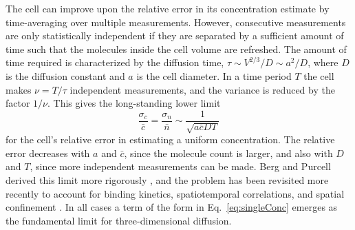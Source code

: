 The cell can improve upon the relative error in its concentration estimate by time-averaging over multiple measurements. However, consecutive measurements are only statistically independent if they are separated by a sufficient amount of time such that the molecules inside the cell volume are refreshed. The amount of time required is characterized by the diffusion time, $\tau \sim V^{2/3}/D \sim a^2/D$, where $D$ is the diffusion constant and $a$ is the cell diameter. In a time period $T$ the cell makes $\nu = T/\tau$ independent measurements, and the variance is reduced by the factor $1/\nu$. This gives the long-standing lower limit
\begin{equation} \label{eq:singleConc}
\frac{ \sigma_c }{\bar{c}} = \frac{ \sigma_n}{\bar{n}} \sim \frac{1}{\sqrt{a\bar{c}DT}}
\end{equation}
for the cell's relative error in estimating a uniform concentration.
The relative error decreases with $a$ and $\bar{c}$, since the molecule count is larger, and also with $D$ and $T$, since more independent measurements can be made. Berg and Purcell derived this limit more rigorously \cite{berg1977physics}, and the problem has been revisited more recently to account for binding kinetics, spatiotemporal correlations, and spatial confinement \cite{bialek2005physical, kaizu2014berg, bicknell2015limits}. In all cases a term of the form in Eq.\ \ref{eq:singleConc} emerges as the fundamental limit for three-dimensional diffusion.

